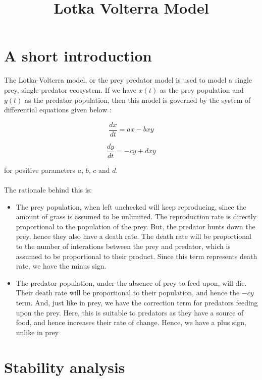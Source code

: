 \documentclass{article}
\title{Lotka Volterra Model}
\date{}
\begin{document}
\maketitle

\section{A short introduction}
The Lotka-Volterra model, or the prey predator model is used to model a single prey, single predator ecosystem. If we have $x(t)$ as the prey population and $y(t)$ as the predator population, then this model is governed by the system of differential equations given below :

\begin{equation}
\frac{dx}{dt} = ax - bxy
\end{equation}

\begin{equation}
\frac{dy}{dt} = -cy + dxy
\end{equation}

for positive parameters $a$, $b$, $c$ and $d$.
\\
\\
The rationale behind this is:

\begin{itemize}
\item The prey population, when left unchecked will keep reproducing, since the amount of grass is assumed to be unlimited. The reproduction rate is directly proportional to the population of the prey. But, the predator hunts down the prey, hence they also have a death rate. The death rate will be proportional to the number of interations between the prey and predator, which is assumed to be proportional to their product. Since this term represents death rate, we have the minus sign.

\item The predator population, under the absence of prey to feed upon, will die. Their death rate will be proportional to their population, and hence the $-cy$ term. And, just like in prey, we have the correction term for predators feeding upon the prey. Here, this is suitable to predators as they have a source of food, and hence increases their rate of change. Hence, we have a plus sign, unlike in prey
\end{itemize}



\section{Stability analysis}
\end{document}
